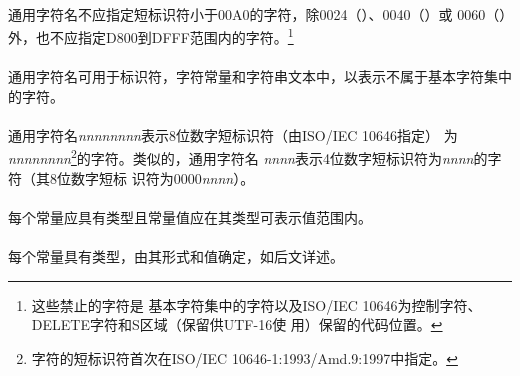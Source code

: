 {\constraint
\paragraph{}
通用字符名不应指定短标识符小于00A0的字符，除0024（\tm{\$}）、0040（）或
0060（\tm{\sq}）外，也不应指定D800到DFFF范围内的字符。\footnote{这些禁止的字符是
基本字符集中的字符以及ISO/IEC 10646为控制字符、DELETE字符和S区域（保留供UTF-16使
用）保留的代码位置。}

\desc
\paragraph{}
通用字符名可用于标识符，字符常量和字符串文本中，以表示不属于基本字符集中的字符。

\semantic
\paragraph{}
通用字符名\textit{nnnnnnnn}表示8位数字短标识符（由ISO/IEC 10646指定）
为\linebreak\textit{nnnnnnnn}\footnote{字符的短标识符首次在ISO/IEC
10646-1:1993/Amd.9:1997中指定。}的字符。类似的，通用字符名
\textit{nnnn}表示4位数字短标识符为\textit{nnnn}的字符（其8位数字短标
识符为0000\textit{nnnn}）。

\syntax
\paragraph{}

\constraint
\paragraph{}
每个常量应具有类型且常量值应在其类型可表示值范围内。

\semantic
\paragraph{}
每个常量具有类型，由其形式和值确定，如后文详述。

\syntax
}
